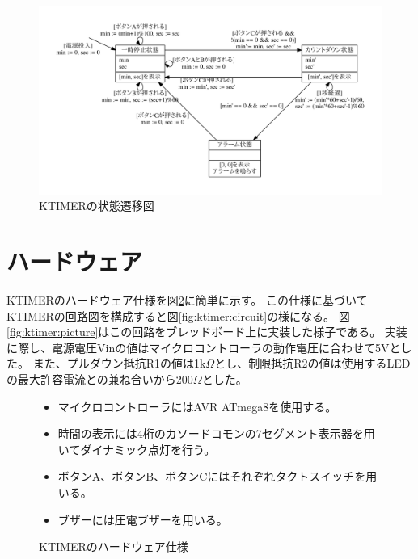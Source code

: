 \begin{figure}[h]
 \begin{center}
  \includegraphics[width=155mm]{figure/ktimer_state.pdf}
 \end{center}
 \caption{KTIMERの状態遷移図}
 \label{fig:ktimer:state}
\end{figure}

\clearpage
\section{ハードウェア}
KTIMERのハードウェア仕様を図\ref{fig:ktimer:hardware}に簡単に示す。
この仕様に基づいてKTIMERの回路図を構成すると図\ref{fig:ktimer:circuit}の様になる。
図\ref{fig:ktimer:picture}はこの回路をブレッドボード上に実装した様子である。
実装に際し、電源電圧Vinの値はマイクロコントローラの動作電圧に合わせて5Vとした。
また、プルダウン抵抗R1の値は1k$\Omega$とし、制限抵抗R2の値は使用するLEDの最大許容電流との兼ね合いから200$\Omega$とした。

\begin{figure}[h]
\begin{screen}
\begin{itemize}
  \item マイクロコントローラにはAVR ATmega8を使用する。
  \item 時間の表示には4桁のカソードコモンの7セグメント表示器を用いてダイナミック点灯を行う。
  \item ボタンA、ボタンB、ボタンCにはそれぞれタクトスイッチを用いる。
  \item ブザーには圧電ブザーを用いる。
\end{itemize}
\end{screen}
\caption{KTIMERのハードウェア仕様}
\label{fig:ktimer:hardware}
\end{figure}


